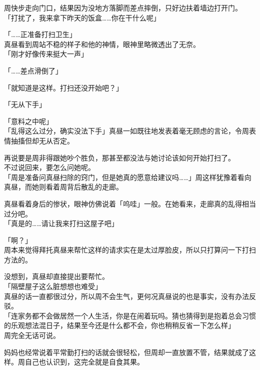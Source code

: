 周快步走向门口，结果因为没地方落脚而差点摔倒，只好边扶着墙边打开门。\\

「打扰了，我来拿下昨天的饭盒……你在干什么呢」

「……正准备打扫卫生」\\

真昼看到周站不稳的样子和他的神情，眼神里略微透出了无奈。\\

「刚才好像传来挺大一声」

「……差点滑倒了」

「就知道是这样。打扫还没开始吧？」

「无从下手」

「意料之中呢」\\

「乱得这么过分，确实没法下手」真昼一如既往地发表着毫无顾虑的言论，令周表情抽搐但却无从否定。

再说要是周非得跟她吵个胜负，那甚至都没法与她讨论该如何开始打扫了。\\

不过说回来，要怎么问她呢。\\

「周是准备问真昼扫除的窍门，但是她真的愿意给建议吗……」周这样犹豫着看向真昼，而她则看着周背后散乱的走廊。

真昼看着身后的惨状，眼神仿佛说着「呜哇」一般。在她看来，走廊真的乱得相当过分吧。\\

「真是的……请让我来打扫这屋子吧」

「啊？」\\

周本来觉得拜托真昼来帮忙这样的请求实在是太过厚脸皮，所以只打算问一下打扫方法的。

没想到，真昼却直接提出要帮忙。\\

「隔壁屋子这么脏想想也难受」\\

真昼的话一直都很过分，所以周不会生气，更何况真昼说的也是事实，没有办法反驳。\\

「连家务都不会做居然一个人生活，你是在闹着玩吗。猜也猜得到是抱着总会习惯的乐观想法混日子，结果至今还是什么都不会，你也稍稍反省一下怎么样」\\

周完全无话可说。

妈妈也经常说着平常勤打扫的话就会很轻松，但周却一直放置不管，结果就成了这样。周自己也认识到，这完全就是自食其果。\\

